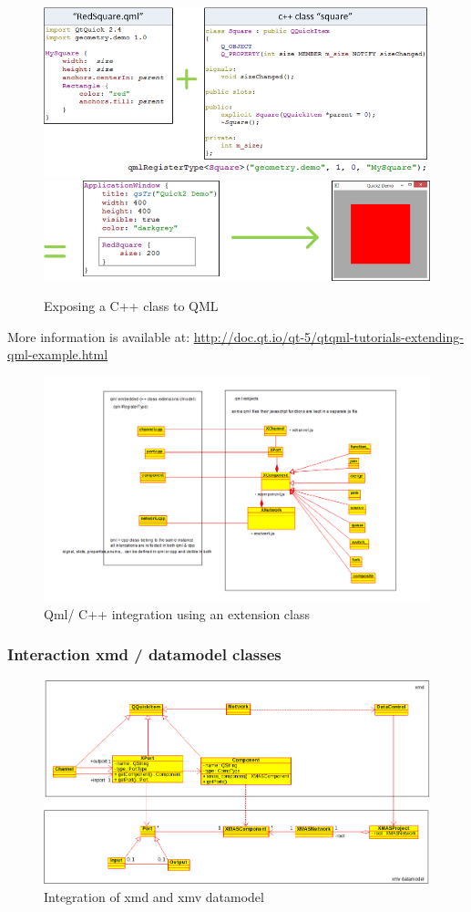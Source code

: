 \begin{figure}
    \includegraphics[width=\textwidth]{qml1}
    \includegraphics[width=\textwidth]{qml2}
    \caption{Exposing a C++ class to QML}
    \label{fig:register-qml}
\end{figure}

More information is available at:
\url{http://doc.qt.io/qt-5/qtqml-tutorials-extending-qml-example.html}






\begin{figure}
    \includegraphics[width=\textwidth]{qml-cpp-extension}
    \caption{Qml/ C++ integration using an extension class}
\end{figure}


\subsubsection{Interaction xmd / datamodel classes}

\begin{figure}
    \includegraphics[width=\textwidth]{xmd-xmv-integration}
    \caption{Integration of xmd and xmv datamodel}
\end{figure}
